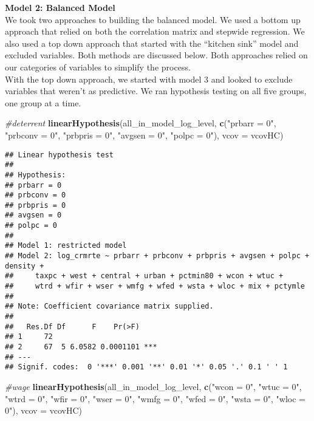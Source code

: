 \documentclass[
]{article}
\newenvironment{Shaded}{\begin{snugshade}}{\end{snugshade}}
\newcommand{\CommentTok}[1]{\textcolor[rgb]{0.56,0.35,0.01}{\textit{#1}}}
\newcommand{\DataTypeTok}[1]{\textcolor[rgb]{0.13,0.29,0.53}{#1}}
\newcommand{\KeywordTok}[1]{\textcolor[rgb]{0.13,0.29,0.53}{\textbf{#1}}}
\newcommand{\NormalTok}[1]{#1}
\newcommand{\StringTok}[1]{\textcolor[rgb]{0.31,0.60,0.02}{#1}}
\begin{document}
\textbf{Model 2: Balanced Model}\\
We took two approaches to building the balanced model. We used a bottom
up approach that relied on both the correlation matrix and stepwide
regression. We also used a top down approach that started with the
``kitchen sink'' model and excluded variables. Both methods are
discussed below. Both approaches relied on our categories of variables
to simplify the process.\\

With the top down approach, we started with model 3 and looked to
exclude variables that weren't as predictive. We ran hypothesis testing
on all five groups, one group at a time.

\begin{Shaded}
\begin{Highlighting}[]
\CommentTok{#deterrent}
\KeywordTok{linearHypothesis}\NormalTok{(all_in_model_log_level, }
                 \KeywordTok{c}\NormalTok{(}\StringTok{"prbarr = 0"}\NormalTok{, }\StringTok{"prbconv = 0"}\NormalTok{, }\StringTok{"prbpris = 0"}\NormalTok{,}
                   \StringTok{"avgsen = 0"}\NormalTok{, }\StringTok{"polpc = 0"}\NormalTok{), }
                 \DataTypeTok{vcov =}\NormalTok{ vcovHC)}
\end{Highlighting}
\end{Shaded}

\begin{verbatim}
## Linear hypothesis test
## 
## Hypothesis:
## prbarr = 0
## prbconv = 0
## prbpris = 0
## avgsen = 0
## polpc = 0
## 
## Model 1: restricted model
## Model 2: log_crmrte ~ prbarr + prbconv + prbpris + avgsen + polpc + density + 
##     taxpc + west + central + urban + pctmin80 + wcon + wtuc + 
##     wtrd + wfir + wser + wmfg + wfed + wsta + wloc + mix + pctymle
## 
## Note: Coefficient covariance matrix supplied.
## 
##   Res.Df Df      F    Pr(>F)    
## 1     72                        
## 2     67  5 6.0582 0.0001101 ***
## ---
## Signif. codes:  0 '***' 0.001 '**' 0.01 '*' 0.05 '.' 0.1 ' ' 1
\end{verbatim}

\begin{Shaded}
\begin{Highlighting}[]
\CommentTok{#wage}
\KeywordTok{linearHypothesis}\NormalTok{(all_in_model_log_level, }
                 \KeywordTok{c}\NormalTok{(}\StringTok{"wcon = 0"}\NormalTok{, }\StringTok{"wtuc = 0"}\NormalTok{, }\StringTok{"wtrd = 0"}\NormalTok{,}
                   \StringTok{"wfir = 0"}\NormalTok{, }\StringTok{"wser = 0"}\NormalTok{, }\StringTok{"wmfg = 0"}\NormalTok{,}
                   \StringTok{"wfed = 0"}\NormalTok{, }\StringTok{"wsta = 0"}\NormalTok{, }\StringTok{"wloc = 0"}\NormalTok{), }
                 \DataTypeTok{vcov =}\NormalTok{ vcovHC)}
\end{Highlighting}
\end{Shaded}
\end{document}
